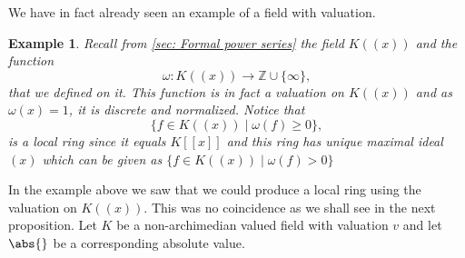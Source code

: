\documentclass{article}
\newtheorem{example}{Example}[section]
\newcommand{\mbb}[1]{\mathbb{#1}}
\numberwithin{equation}{section}
\begin{document}
We have in fact already seen an example of a field with valuation.
\begin{example}\label{ex: K((x)) is valued field}
    Recall from \cref{sec: Formal power series} the field $K((x))$ and the function $$\omega : K((x)) \to \mbb Z \cup \{ \infty \},$$ that we defined on it. This function is in fact a valuation on $K((x))$ and as $\omega(x) = 1$,
    it is discrete and normalized. Notice that
    $$\{f \in K((x)) \mid \omega(f) \geq 0 \},$$
    is a local ring since it equals $K[[x]]$ and this ring has unique maximal ideal $(x)$ which can be given as
    $\{ f \in K((x)) \mid \omega(f) > 0\}$ 
\end{example}

In the example above we saw that we could produce a local ring using the valuation on $K((x))$. This was no coincidence as we shall see in the next proposition. Let $K$ be a non-archimedian valued field with valuation $v$ and let $\abs{}$ be a corresponding absolute value. 
\end{document}
